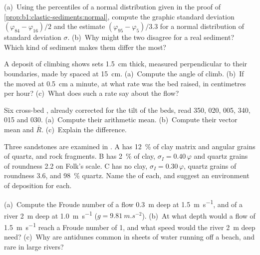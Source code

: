 \begin{exercise}[$\star\star$]\label{exo:b1:clastic-sediments:5}
(a)~Using the percentiles of a normal distribution given in the proof of
\cref{prop:b1:clastic-sediments:normal}, compute the graphic standard
deviation $(\varphi_{84} - \varphi_{16})/2$ and the estimate
$(\varphi_{95} - \varphi_5)/3.3$ for a normal distribution of standard
deviation $\sigma$. (b)~Why might the two disagree for a real sediment? Which
kind of sediment makes them differ the most?
\end{exercise}

\begin{exercise}[$\star\star$]\label{exo:b1:clastic-sediments:6}
A deposit of climbing  shows sets \qty{1.5}{cm} thick, measured
perpendicular to their boundaries, made by  spaced at \qty{15}{cm}.
(a)~Compute the angle of climb. (b)~If the  moved at
\qty{0.5}{cm} a minute, at what rate was the bed raised, in centimetres per
hour? (c)~What does such a rate say about the flow?
\end{exercise}

\begin{exercise}[$\star\star$]\label{exo:b1:clastic-sediments:7}
Six cross-bed , already corrected for the tilt of the beds,
read 350, 020, 005, 340, 015 and 030. (a)~Compute their arithmetic mean. (b)~Compute
their vector mean and $\bar R$. (c)~Explain the difference.
\end{exercise}

\begin{exercise}[$\star\star$]\label{exo:b1:clastic-sediments:8}
Three sandstones are examined in . A has \qty{12}{\percent} of
clay matrix and angular grains of quartz,  and rock fragments. B has
\qty{2}{\percent} of clay, $\sigma_I = 0.40\,\varphi$ and quartz grains of
roundness \num{2.2} on Folk's scale. C has no clay, $\sigma_I =
0.30\,\varphi$, quartz grains of roundness \num{3.6}, and \qty{98}{\percent}
quartz. Name the  of each, and suggest an environment of
deposition for each.
\end{exercise}

\begin{exercise}[$\star\star$]\label{exo:b1:clastic-sediments:9}
(a)~Compute the Froude number of a flow \qty{0.3}{m} deep at
\qty{1.5}{m.s^{-1}}, and of a river \qty{2}{m} deep at \qty{1.0}{m.s^{-1}} ($g
= \qty{9.81}{m.s^{-2}}$). (b)~At what depth would a flow of
\qty{1.5}{m.s^{-1}} reach a Froude number of 1, and what speed would the river
\qty{2}{m} deep need? (c)~Why are antidunes common in sheets of water running
off a beach, and rare in large rivers?
\end{exercise}

